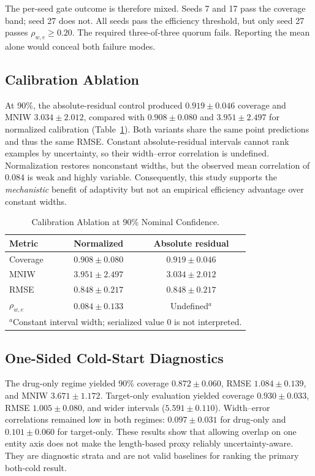 \documentclass[lettersize,journal]{IEEEtran}
\begin{document}
The per-seed gate outcome is therefore mixed. Seeds 7 and 17 pass the coverage band; seed 27 does not. All seeds pass the efficiency threshold, but only seed 27 passes $\rho_{w,e}\ge0.20$. The required three-of-three quorum fails. Reporting the mean alone would conceal both failure modes.

\subsection{Calibration Ablation}
At 90\%, the absolute-residual control produced $0.919\pm0.046$ coverage and MNIW $3.034\pm2.012$, compared with $0.908\pm0.080$ and $3.951\pm2.497$ for normalized calibration (Table~\ref{tab:ablation}). Both variants share the same point predictions and thus the same RMSE. Constant absolute-residual intervals cannot rank examples by uncertainty, so their width--error correlation is undefined. Normalization restores nonconstant widths, but the observed mean correlation of $0.084$ is weak and highly variable. Consequently, this study supports the \emph{mechanistic} benefit of adaptivity but not an empirical efficiency advantage over constant widths.

\begin{table}[!t]
\caption{Calibration Ablation at 90\% Nominal Confidence.}
\label{tab:ablation}
\centering
\begin{tabular}{lcc}
\toprule
Metric & Normalized & Absolute residual \\
\midrule
Coverage & $0.908\pm0.080$ & $0.919\pm0.046$ \\
MNIW & $3.951\pm2.497$ & $3.034\pm2.012$ \\
RMSE & $0.848\pm0.217$ & $0.848\pm0.217$ \\
$\rho_{w,e}$ & $0.084\pm0.133$ & Undefined$^{a}$ \\
\bottomrule
\multicolumn{3}{l}{\footnotesize $^{a}$Constant interval width; serialized value 0 is not interpreted.}
\end{tabular}
\end{table}

\subsection{One-Sided Cold-Start Diagnostics}
The drug-only regime yielded 90\% coverage $0.872\pm0.060$, RMSE $1.084\pm0.139$, and MNIW $3.671\pm1.172$. Target-only evaluation yielded coverage $0.930\pm0.033$, RMSE $1.005\pm0.080$, and wider intervals ($5.591\pm0.110$). Width--error correlations remained low in both regimes: $0.097\pm0.031$ for drug-only and $0.101\pm0.060$ for target-only. These results show that allowing overlap on one entity axis does not make the length-based proxy reliably uncertainty-aware. They are diagnostic strata and are not valid baselines for ranking the primary both-cold result.
\end{document}
